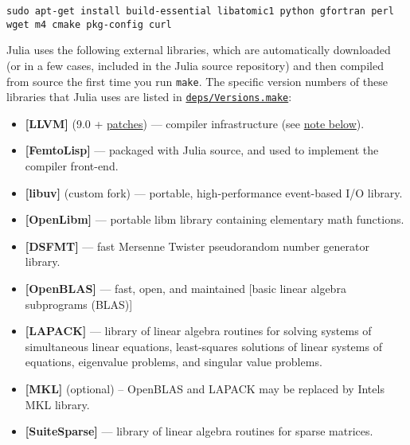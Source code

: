 \begin{lstlisting}
sudo apt-get install build-essential libatomic1 python gfortran perl wget m4 cmake pkg-config curl
\end{lstlisting}



Julia uses the following external libraries, which are automatically downloaded (or in a few cases, included in the Julia source repository) and then compiled from source the first time you run \texttt{make}. The specific version numbers of these libraries that Julia uses are listed in \href{https://github.com/JuliaLang/julia/blob/master/deps/Versions.make}{\texttt{deps/Versions.make}}:



\begin{itemize}
\item \textbf{[LLVM]} (9.0 + \href{https://github.com/JuliaLang/julia/tree/master/deps/patches}{patches}) — compiler infrastructure (see \href{\#llvm}{note below}).


\item \textbf{[FemtoLisp]}            — packaged with Julia source, and used to implement the compiler front-end.


\item \textbf{[libuv]}  (custom fork) — portable, high-performance event-based I/O library.


\item \textbf{[OpenLibm]}             — portable libm library containing elementary math functions.


\item \textbf{[DSFMT]}                — fast Mersenne Twister pseudorandom number generator library.


\item \textbf{[OpenBLAS]}             — fast, open, and maintained [basic linear algebra subprograms (BLAS)]


\item \textbf{[LAPACK]}               — library of linear algebra routines for solving systems of simultaneous linear equations, least-squares solutions of linear systems of equations, eigenvalue problems, and singular value problems.


\item \textbf{[MKL]} (optional)       – OpenBLAS and LAPACK may be replaced by Intel{\textquotesingle}s MKL library.


\item \textbf{[SuiteSparse]}          — library of linear algebra routines for sparse matrices.



\end{itemize}
